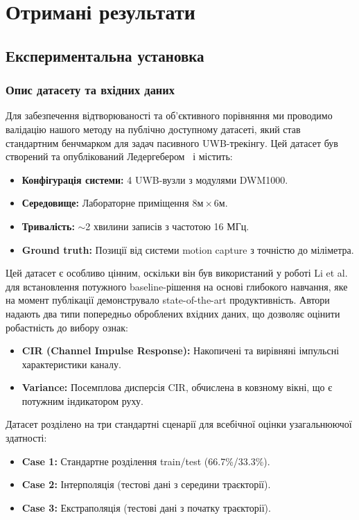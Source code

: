 \documentclass[12pt,a4paper]{article}
\begin{document}
\section{Отримані результати}

\subsection{Експериментальна установка}
\label{sec:experimental_setup}

\subsubsection{Опис датасету та вхідних даних}

Для забезпечення відтворюваності та об'єктивного порівняння ми проводимо валідацію нашого методу на публічно доступному датасеті, який став стандартним бенчмарком для задач пасивного UWB-трекінгу. Цей датасет був створений та опублікований Ледергебером~\cite{ledergerber2020dataset} і містить:
\begin{itemize}
	\item \textbf{Конфігурація системи:} 4 UWB-вузли з модулями DWM1000.
	\item \textbf{Середовище:} Лабораторне приміщення $8\text{м} \times 6\text{м}$.
	\item \textbf{Тривалість:} $\sim$2 хвилини записів з частотою 16 МГц.
	\item \textbf{Ground truth:} Позиції від системи motion capture з точністю до міліметра.
\end{itemize}

Цей датасет є особливо цінним, оскільки він був використаний у роботі Li et al.~\cite{li2021multi} для встановлення потужного baseline-рішення на основі глибокого навчання, яке на момент публікації демонструвало state-of-the-art продуктивність. Автори надають два типи попередньо оброблених вхідних даних, що дозволяє оцінити робастність до вибору ознак:
\begin{itemize}
	\item \textbf{CIR (Channel Impulse Response):} Накопичені та вирівняні імпульсні характеристики каналу.
	\item \textbf{Variance:} Посемплова дисперсія CIR, обчислена в ковзному вікні, що є потужним індикатором руху.
\end{itemize}

Датасет розділено на три стандартні сценарії для всебічної оцінки узагальнюючої здатності:
\begin{itemize}
	\item \textbf{Case 1:} Стандартне розділення train/test (66.7\%/33.3\%).
	\item \textbf{Case 2:} Інтерполяція (тестові дані з середини траєкторії).
	\item \textbf{Case 3:} Екстраполяція (тестові дані з початку траєкторії).
\end{itemize}
\end{document}

